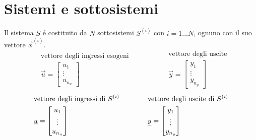 \documentclass[../main.tex]{subfiles}
\begin{document}
	\section{Sistemi e sottosistemi}
		Il sistema $ S $ \'e costituito da $ N $ sottosistemi $ S^{(i)} $ con $ i = 1...N $, ognuno con il suo vettore $ \vec x^{(i)} $.
		\[
			\begin{aligned}
				&\text{vettore degli ingressi esogeni}
				\\
				&\vec u =
				\begin{bmatrix}
					u_1\\
					\vdots\\
					u_{n_u}
				\end{bmatrix}
			\end{aligned}
			\qquad\qquad
			\begin{aligned}
				&\text{vettore degli uscite}
				\\
				&\vec y =
				\begin{bmatrix}
					y_1\\
					\vdots\\
					y_{n_y}
				\end{bmatrix}
			\end{aligned}
		\]
		\[
			\begin{aligned}
				&\text{vettore degli ingressi di $ S^{(i)} $}
				\\
				&\vec u =
				\begin{bmatrix}
					u_1\\
					\vdots\\
					u_{n_u}
				\end{bmatrix}
			\end{aligned}
			\qquad\qquad
			\begin{aligned}
				&\text{vettore degli uscite di $ S^{(i)} $}
				\\
				&\vec y =
				\begin{bmatrix}
					y_1\\
					\vdots\\
					y_{n_y}
				\end{bmatrix}
			\end{aligned}
		\]
	
\end{document}
